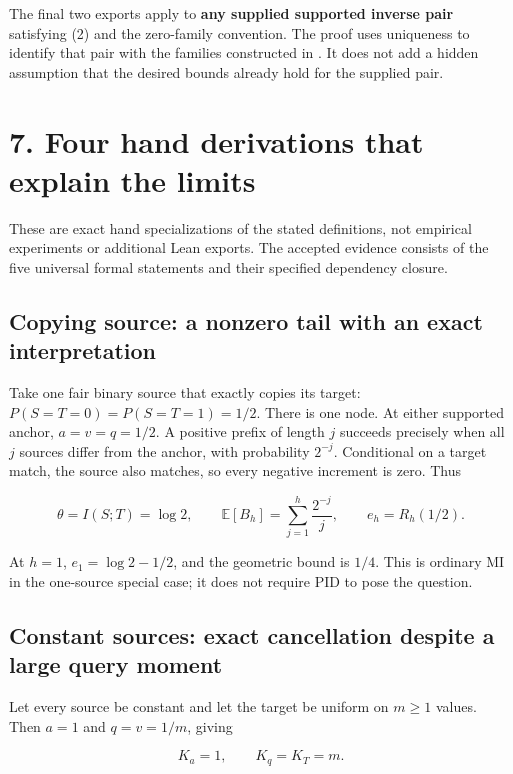 \documentclass[11pt,a4paper]{article}
\let\PidSavedTexttt\texttt
\renewcommand{\texttt}[1]{\PidSavedTexttt{\seqsplit{#1}}}
\begin{document}
The final two exports apply to \textbf{any supplied supported inverse pair} satisfying (2) and the zero-family convention. The proof uses uniqueness to identify that pair with the families constructed in \mbox{\texttt{actual\_finite\_bias}}. It does not add a hidden assumption that the desired bounds already hold for the supplied pair.

\section{7. Four hand derivations that explain the limits}\label{four-hand-derivations-that-explain-the-limits}

These are exact hand specializations of the stated definitions, not empirical experiments or additional Lean exports. The accepted evidence consists of the five universal formal statements and their specified dependency closure.

\subsection{Copying source: a nonzero tail with an exact interpretation}\label{copying-source-a-nonzero-tail-with-an-exact-interpretation}

Take one fair binary source that exactly copies its target: \(P(S=T=0)=P(S=T=1)=1/2\). There is one node. At either supported anchor, \(a=v=q=1/2\). A positive prefix of length \(j\) succeeds precisely when all \(j\) sources differ from the anchor, with probability \(2^{-j}\). Conditional on a target match, the source also matches, so every negative increment is zero. Thus

\[
\theta=I(S;T)=\log2,\qquad
\mathbb E[B_h]=\sum_{j=1}^{h}\frac{2^{-j}}j,
\qquad e_h=R_h(1/2).
\]

At \(h=1\), \(e_1=\log2-1/2\), and the geometric bound is \(1/4\). This is ordinary MI in the one-source special case; it does not require PID to pose the question.

\subsection{Constant sources: exact cancellation despite a large query moment}\label{constant-sources-exact-cancellation-despite-a-large-query-moment}

Let every source be constant and let the target be uniform on \(m\ge1\) values. Then \(a=1\) and \(q=v=1/m\), giving

\[
K_a=1,\qquad K_q=K_T=m.
\]
\end{document}
